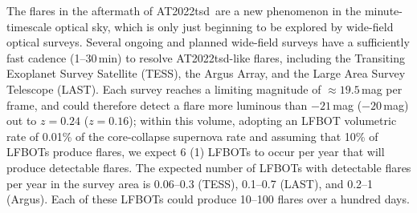 \documentclass{nature_plusfigure}
\newcommand{\at}{AT2022tsd}
\begin{document}
The flares in the aftermath of \at\ are a new phenomenon in the minute-timescale optical sky, which is only just beginning to be explored by wide-field optical surveys\cite{Andreoni2020,Richmond2020,Corbett2023,Ofek2023}.
Several ongoing and planned wide-field surveys have a sufficiently fast cadence (1--30\,min) to resolve \at-like flares, including the Transiting Exoplanet Survey Satellite (TESS\cite{Ricker2015}), the Argus Array\cite{Law2022}, and the Large Area Survey Telescope (LAST\cite{Ofek2023}). Each survey reaches a limiting magnitude of $\approx19.5$\,mag per frame, and could therefore detect a flare more luminous than $-21$\,mag ($-20$\,mag) out to $z=0.24$ ($z=0.16$);
within this volume, adopting an LFBOT volumetric rate of 0.01\% of the core-collapse supernova rate\cite{Ho2022_RET} and assuming that 10\% of LFBOTs produce flares, we expect 6 (1) LFBOTs to occur per year that will produce detectable flares. The expected number of LFBOTs with detectable flares per year in the survey area is 0.06--0.3 (TESS), 0.1--0.7 (LAST), and 0.2--1 (Argus). Each of these LFBOTs could produce 10--100 flares over a hundred days.

\newpage
\end{document}
